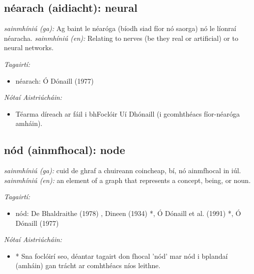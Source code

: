 \documentclass{article}
\begin{document}
\subsection*{néarach (aidiacht): neural} 
 \noindent \textit{sainmhíniú (ga):} Ag baint le néaróga (bíodh siad fíor nó saorga) nó le líonraí néaracha.
\newline\newline
 \noindent \textit{sainmhíniú (en):} Relating to nerves (be they real or artificial) or to neural networks.
\newline

 \noindent \textit{Tagairtí:}
\begin{itemize}
	\item néarach: Ó Dónaill (1977) \cite{odonaill}
\end{itemize}

 \noindent \textit{Nótaí Aistriúcháin:}
\begin{itemize}
	\item Téarma díreach ar fáil i bhFoclóir Uí Dhónaill (i gcomhthéacs fíor-néaróga amháin).
\end{itemize}


\subsection*{nód (ainmfhocal): node} 
 \noindent \textit{sainmhíniú (ga):} cuid de ghraf a chuireann coincheap, bí, nó ainmfhocal in iúl.
\newline\newline
 \noindent \textit{sainmhíniú (en):} an element of a graph that represents a concept, being, or noun.
\newline

 \noindent \textit{Tagairtí:}
\begin{itemize}
	\item nód: De Bhaldraithe (1978) \cite{de-bhaldraithe}, Dineen (1934) \cite{dineen}*, Ó Dónaill et al. (1991) \cite{focloir-beag}*, Ó Dónaill (1977) \cite{odonaill}
\end{itemize}

 \noindent \textit{Nótaí Aistriúcháin:}
\begin{itemize}
	\item * Sna foclóirí seo, déantar tagairt don fhocal 'nód' mar nód i bplandaí (amháin) gan trácht ar comhthéacs níos leithne.
\end{itemize}
\end{document}
